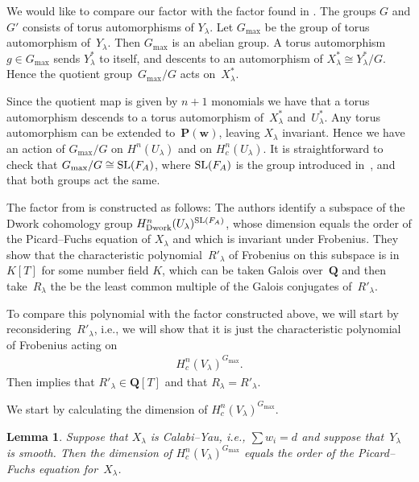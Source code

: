 \documentclass[pdftex]{sigma}
\numberwithin{equation}{section}
\newtheorem{Lemma}[Theorem]{Lemma}
\begin{document}
We would like to compare our factor with the factor found in \cite{DKSSVW}. The groups $G$ and $G'$ consists of torus automorphisms of $Y_\lambda$. Let $G_{\max}$ be the group of torus automorphism of~$Y_{\lambda}$. Then $G_{\max}$ is an abelian group. A torus automorphism $g\in G_{\max}$ sends $Y^*_\lambda$ to itself, and descents to an automorphism of $X^*_\lambda\cong Y^*_{\lambda}/G$. Hence the quotient group~$G_{\max}/G$ acts on~$X^*_\lambda$.

Since the quotient map is given by $n+1$ monomials we have that a torus automorphism descends to a torus automorphism of~$X^*_\lambda$ and~$U^*_{\lambda}$. Any torus automorphism can be extended to~$\mathbf{P}(\mathbf{w})$, leaving $X_\lambda$ invariant. Hence we have an action of $G_{\max}/G$ on $H^n(U_\lambda)$ and on $H^n_c(U_{\lambda})$. It is straightforward to check that $G_{\max}/G\cong {\rm SL}(F_A)$, where ${\rm SL}(F_A)$ is the group introduced in~\cite{DKSSVW}, and that both groups act the same.

The factor from \cite{DKSSVW} is constructed as follows: The authors identify a subspace of the Dwork cohomology group $H^n_{\rm Dwork}(U_{\lambda})^{{\rm SL}(F_A)}$, whose dimension equals the order of the Picard--Fuchs equation of $X_{\lambda}$ and which is invariant under Frobenius. They show that the characteristic polynomial~$R'_{\lambda}$ of Frobenius on this subspace is in $K[T]$ for some number f\/ield $K$, which can be taken Galois over~$\mathbf{Q}$ and then take~$R_{\lambda}$ the be the least common multiple of the Galois conjugates of~$R'_{\lambda}$.

To compare this polynomial with the factor constructed above, we will start by reconside\-ring~$R'_{\lambda}$, i.e., we will show that it is just the characteristic polynomial of Frobenius acting on
\begin{gather*} H^n_c(V_\lambda)^{G_{\max}}. \end{gather*}
Then \cite[Lemma~4.3]{Zetafamrec} implies that $R'_{\lambda}\in \mathbf{Q}[T]$ and that $R_\lambda=R'_\lambda$.

We start by calculating the dimension of $H^n_c(V_\lambda)^{G_{\max}}$.
\begin{Lemma} \label{lemPF} Suppose that $X_{\lambda}$ is Calabi--Yau, i.e., $\sum w_i=d$ and suppose that~$Y_\lambda$ is smooth. Then the dimension of $H^n_c(V_\lambda)^{G_{\max}}$ equals the order of the Picard--Fuchs equation for~$X_\lambda$.
\end{Lemma}
\end{document}
